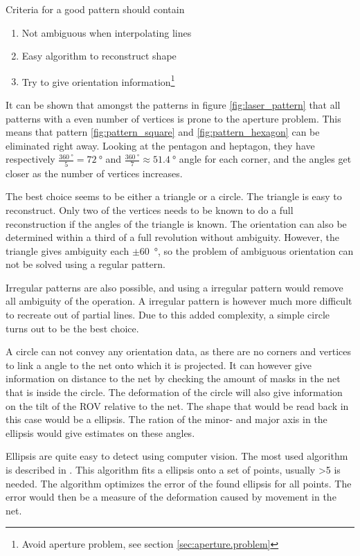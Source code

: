 Criteria for a good pattern should contain
\begin{enumerate}
	\item Not ambiguous when interpolating lines
	\item Easy algorithm to reconstruct shape
	\item Try to give orientation information\footnote{Avoid aperture problem, see section \vref{sec:aperture.problem}}
\end{enumerate}

It can be shown that amongst the patterns in figure \vref{fig:laser_pattern} that all patterns with a even number 
of vertices is prone to the aperture problem. This means that pattern \ref{fig:pattern_square} 
and \ref{fig:pattern_hexagon} can be eliminated right away. Looking at the pentagon and heptagon, they 
have respectively $\frac{\SI{360}{\degree}}{5} = \SI{72}{\degree}$ and $\frac{\SI{360}{\degree}}{7} \approx \SI{51.4}{\degree}$ angle 
for each corner, and the angles get closer as the number of vertices increases.

The best choice seems to be either a triangle or a circle. The triangle is easy to reconstruct. Only two of the vertices 
needs to be known to do a full reconstruction if the angles of the triangle is known. The orientation can 
also be determined within a third of a full revolution without ambiguity. However, the triangle 
gives ambiguity each $\pm$\SI{60}{\degree}, so the problem of ambiguous orientation can not be solved using a 
regular pattern.

Irregular patterns are also possible, and using a irregular pattern would remove all ambiguity of the operation. A irregular 
pattern is however much more difficult to recreate out of partial lines. Due to this added complexity, a simple circle turns out 
to be the best choice.

A circle can not convey any orientation data, as there are no corners and vertices to link a angle to the net onto which it is projected.
It can however give information on distance to the net by checking the amount of masks in the net that is inside the circle. The 
deformation of the circle will also give information on the tilt of the ROV relative to the net. The shape that would be read back in 
this case would be a ellipsis. The ration of the minor- and major axis in the ellipsis would give estimates on these angles. 

Ellipsis are quite easy to detect using computer vision. The most used algorithm is described in \citet{fitzgibbon95}. This algorithm fits a ellipsis onto a set of points, usually >5 is needed. The algorithm optimizes the error of the found ellipsis for all 
points. The error would then be a measure of the deformation caused by movement in the net.

